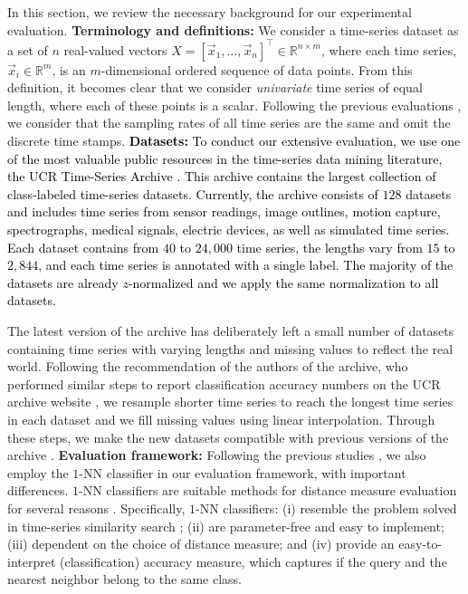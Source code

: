 \documentclass[11pt]{article}
\begin{document}
In this section, we review the necessary background for our experimental evaluation.
\newline \textbf{Terminology and definitions: } We consider a time-series dataset as a set of $n$ real-valued vectors $X=[\vec{x}_1,\ldots,\vec{x}_n]^\top\!\in\!\mathbb{R}^{n \times m}$, where each time series, $\vec{x}_i\!\in\!\mathbb{R}^{m}$, is an $m$-dimensional ordered sequence of data points. From this definition, it becomes clear that we consider {\em univariate} time series of equal length, where each of these points is a scalar. Following the previous evaluations \cite{ding2008querying,wang2013experimental,bagnall2017great}, we consider that the sampling rates of all time series are the same and omit the discrete time stamps. 
\newline \textcolor{black}{\textbf{Datasets: } To conduct our extensive evaluation, we use one of the most valuable public resources in the time-series data mining literature, the UCR Time-Series Archive \cite{UCRArchive2018}. This archive contains the largest collection of class-labeled time-series datasets. Currently, the archive consists of $128$ datasets and includes time series from sensor readings, image outlines, motion capture, spectrographs, medical signals, electric devices, as well as simulated time series. Each dataset contains from $40$ to $24,000$ time series, the lengths vary from $15$ to $2,844$, and each time series is annotated with a single label. The majority of the datasets are already $z$-normalized and we apply the same normalization to all datasets.}

The latest version of the archive has deliberately left a small number of datasets containing time series with varying lengths and missing values to reflect the real world. Following the recommendation of the authors of the archive, who performed similar steps to report classification accuracy numbers on the UCR archive website \cite{UCRArchive2018}, we resample shorter time series to reach the longest time series in each dataset and we fill missing values using linear interpolation. Through these steps, we make the new datasets compatible with previous versions of the archive \cite{UCR2018Fixes}.
\newline \textbf{Evaluation framework: } Following the previous studies \cite{ding2008querying,bagnall2017great}, we also employ the $1$-NN classifier in our evaluation framework, with important differences. $1$-NN classifiers are suitable methods for distance measure evaluation for several reasons \cite{ding2008querying}. Specifically, $1$-NN classifiers: (i) resemble the problem solved in time-series similarity search \cite{echihabi2018lernaean}; (ii) are parameter-free and easy to implement; (iii) dependent on the choice of distance measure; and (iv) provide an easy-to-interpret (classification) accuracy measure, which captures if the query and the nearest neighbor belong to the same class. 
\end{document}
